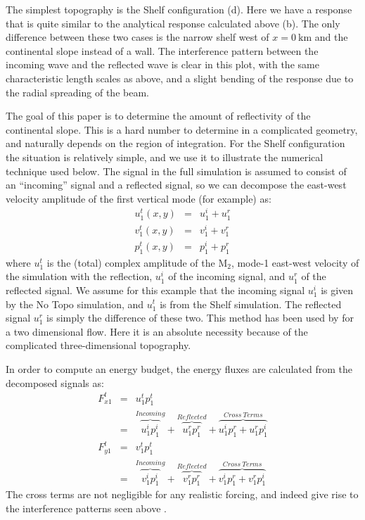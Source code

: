 \documentclass[12pt]{article}
\newcommand{\mn}[1]{{\sc #1}}
\begin{document}
The simplest topography is the \mn{Shelf} configuration (d).  Here we have a response that is quite similar to the analytical response calculated above (b).  The only difference between these two cases is the narrow shelf west of $x=0\ \mathrm{km}$ and the continental slope instead of a wall.  The interference pattern between the incoming wave and the reflected wave is clear in this plot, with the same characteristic length scales as above, and a slight bending of the response due to the radial spreading of the beam.  

The goal of this paper is to determine the amount of reflectivity of the continental slope.  This is a hard number to determine in a complicated geometry, and naturally depends on the region of integration.   For the \mn{Shelf} configuration the situation is relatively simple, and we use it to illustrate the numerical technique used below.  The signal in the full simulation is assumed to consist of an ``incoming'' signal and a reflected signal, so we can decompose the east-west velocity amplitude of the first vertical mode (for example) as:
\begin{eqnarray}
  u_{1}^{t}(x,y) &= &u_{1}^{i}+u_{1}^{r}\\
  v_{1}^{t}(x,y) &= &v_{1}^{i}+v_{1}^{r}\\
  p_{1}^{t}(x,y) &= &p_{1}^{i}+p_{1}^{r}
\end{eqnarray}
where $u_{1}^t$ is the (total) complex amplitude of the $\mathrm{M_2}$, mode-1 east-west velocity of the simulation with the reflection, $u_{1}^i$ of the incoming signal, and $u_{1}^r$ of the reflected signal.  We assume for this example that the incoming signal $u_{1}^i$ is given by the \mn{No Topo} simulation, and $u_{1}^t$ is from the \mn{Shelf} simulation.  The reflected signal $u_1^r$ is simply the difference of these two.  This method has been used by \citet{halletal13} for a two dimensional flow.  Here it is an absolute necessity because of the complicated three-dimensional topography.  

In order to compute an energy budget, the energy fluxes are calculated from the decomposed signals as:
\begin{eqnarray}
  F_{x1}^t & = & u_1^t p_1^t \\
  &= & \overbrace{u_1^ip_1^i}^{Incoming} + \overbrace{u_1^rp_1^r}^{Reflected} + 
  \overbrace{u_1^ip_1^r + u_1^rp_1^i}^{Cross\ Terms} \\
  F_{y1}^t & = & v_1^t p_1^t \\
  &= & \overbrace{v_1^ip_1^i}^{Incoming} + \overbrace{v_1^rp_1^r}^{Reflected} + 
  \overbrace{v_1^ip_1^r + v_1^rp_1^i}^{Cross\ Terms} 
\end{eqnarray}
The cross terms are not negligible for any realistic forcing, and indeed give rise to the interference patterns seen above \citep{nashetal04a,martinietal07}. 
\end{document}
